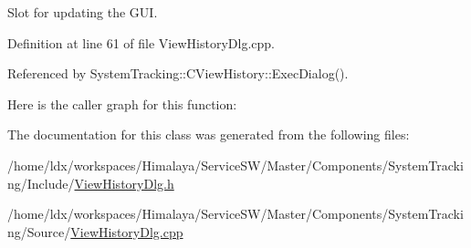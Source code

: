 \-Slot for updating the \-G\-U\-I. 



\-Definition at line 61 of file \-View\-History\-Dlg.\-cpp.



\-Referenced by \-System\-Tracking\-::\-C\-View\-History\-::\-Exec\-Dialog().



\-Here is the caller graph for this function\-:




\-The documentation for this class was generated from the following files\-:\begin{DoxyCompactItemize}
\item 
/home/ldx/workspaces/\-Himalaya/\-Service\-S\-W/\-Master/\-Components/\-System\-Tracking/\-Include/\hyperlink{ViewHistoryDlg_8h}{\-View\-History\-Dlg.\-h}\item 
/home/ldx/workspaces/\-Himalaya/\-Service\-S\-W/\-Master/\-Components/\-System\-Tracking/\-Source/\hyperlink{ViewHistoryDlg_8cpp}{\-View\-History\-Dlg.\-cpp}\end{DoxyCompactItemize}
